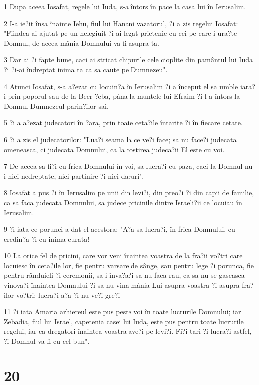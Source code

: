 \par 1 Dupa aceea Iosafat, regele lui Iuda, s-a întors în pace la casa lui în Ierusalim.
\par 2 I-a ie?it însa înainte Iehu, fiul lui Hanani vazatorul, ?i a zis regelui Iosafat: "Fiindca ai ajutat pe un nelegiuit ?i ai legat prietenie cu cei pe care-i ura?te Domnul, de aceea mânia Domnului va fi asupra ta.
\par 3 Dar ai ?i fapte bune, caci ai stricat chipurile cele cioplite din pamântul lui Iuda ?i ?i-ai îndreptat inima ta ca sa caute pe Dumnezeu".
\par 4 Atunci Iosafat, s-a a?ezat cu locuin?a în Ierusalim ?i a început el sa umble iara?i prin poporul sau de la Beer-?eba, pâna la muntele lui Efraim ?i l-a întors la Domnul Dumnezeul parin?ilor sai.
\par 5 ?i a a?ezat judecatori în ?ara, prin toate ceta?ile întarite ?i în fiecare cetate.
\par 6 ?i a zis el judecatorilor: "Lua?i seama la ce ve?i face; sa nu face?i judecata omeneasca, ci judecata Domnului, ca la rostirea judeca?ii El este cu voi.
\par 7 De aceea sa fi?i cu frica Domnului în voi, sa lucra?i cu paza, caci la Domnul nu-i nici nedreptate, nici partinire ?i nici daruri".
\par 8 Iosafat a pus ?i în Ierusalim pe unii din levi?i, din preo?i ?i din capii de familie, ca sa faca judecata Domnului, sa judece pricinile dintre Israeli?ii ce locuiau în Ierusalim.
\par 9 ?i iata ce porunci a dat el acestora: "A?a sa lucra?i, în frica Domnului, cu credin?a ?i cu inima curata!
\par 10 La orice fel de pricini, care vor veni înaintea voastra de la fra?ii vo?tri care locuiesc în ceta?ile lor, fie pentru varsare de sânge, sau pentru lege ?i porunca, fie pentru rânduieli ?i ceremonii, sa-i înva?a?i sa nu faca rau, ca sa nu se gaseasca vinova?i înaintea Domnului ?i sa nu vina mânia Lui asupra voastra ?i asupra fra?ilor vo?tri; lucra?i a?a ?i nu ve?i gre?i
\par 11 ?i iata Amaria arhiereul este pus peste voi în toate lucrurile Domnului; iar Zebadia, fiul lui Israel, capetenia casei lui Iuda, este pus pentru toate lucrurile regelui, iar ca dregatori înaintea voastra ave?i pe levi?i. Fi?i tari ?i lucra?i astfel, ?i Domnul va fi cu cel bun".

\chapter{20}


